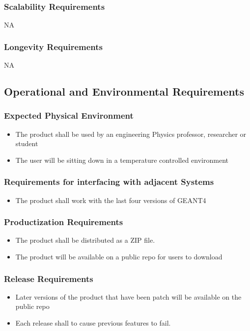 \documentclass[12pt]{article}
\begin{document}
\subsubsection{Scalability Requirements}
NA

\subsubsection{Longevity Requirements}
NA

\subsection{Operational and Environmental Requirements} %
\subsubsection{Expected Physical Environment}
\begin{itemize}
\item The product shall be used by an engineering Physics professor, researcher or student
\item The user will be sitting down in a temperature controlled environment
\end{itemize}
\subsubsection{Requirements for interfacing with adjacent Systems}
\begin{itemize}
\item The product shall work with the last four versions of GEANT4
\end{itemize}
\subsubsection{Productization Requirements}
\begin{itemize}
\item The product shall be distributed as a ZIP file.
\item The product will be available on a public repo for users to download
\end{itemize}
\subsubsection{Release Requirements}
\begin{itemize}
\item Later versions of the product that have been patch will be available on the public repo
\item Each release shall to cause previous features to fail.
\end{itemize}
\end{document}
